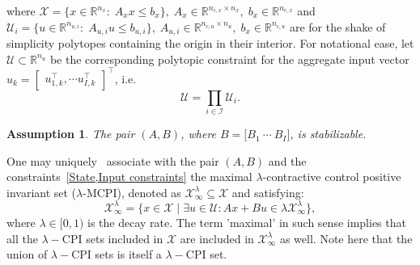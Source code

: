 \documentclass[letterpaper, 10 pt, conference]{ieeeconf}  %
\newcommand{\R}{\mathbb{R}}
\newcommand{\mc}[1]{\mathcal{#1}}
\newtheorem{assumption}{Assumption}
\begin{document}
where $\mc{X} = \{x \in \R^{n_{x}}:\; A_{x}x \leq b_{x}\},\; A_{x} \in \R^{n_{c,x} \times n_{x}},\; b_{x} \in \R^{n_{c,x}}$ and $\mc{U}_{i} =\{ u \in \R^{n_{u,i}}:\; A_{u,i}u \leq b_{u,i}\},\; A_{u,i} \in \R^{n_{c,u} \times n_{u}},\; b_{x} \in \R^{n_{c,u}}$ are for the shake of simplicity polytopes containing the origin in their interior. For notational ease, let $\mc{U} \subset \R^{n_u}$ be the corresponding polytopic constraint for the aggregate input vector $u_{k} = \begin{bmatrix} u^{\top}_{1,k}, \cdots u^{\top}_{I,k}\end{bmatrix}^{\top}$, i.e.
\begin{equation}\label{Aggregate Input constraints}
\mc{U} = \prod_{i \in \mc{I}} \mc{U}_{i}.
\end{equation}
\begin{assumption}\label{Stabilizability Assumption}
The pair $(A,B)$, where $B = \bigl[B_{1}\ \cdots\ B_{I} \bigr]$, is stabilizable.
\end{assumption}
One may uniquely~\cite{Kerrigan2000InvariantSetsinMPC} associate with the pair $(A,B)$ and the constraints~\eqref{State,Input constraints} the maximal $\lambda$-contractive control positive invariant set ($\lambda$-MCPI), denoted as $\mc{X}^{\lambda}_{\infty} \subseteq \mc{X}$ and satisfying:
\begin{equation}\label{λ-MCPI}
\mc{X}^{\lambda}_{\infty} = \{x \in \mc{X} \mid \exists u \in \mc{U} : Ax + Bu \in \lambda \mc{X}^{\lambda}_{\infty}\},
\end{equation}
where $\lambda \in [0, 1)$ is the decay rate. The term 'maximal' in such sense implies that all the $\lambda-$CPI sets included in $\mc{X}$ are included in $\mc{X}^{\lambda}_{\infty}$ as well. Note here that the union of $\lambda-$CPI sets is itself a $\lambda-$CPI set.
\end{document}
